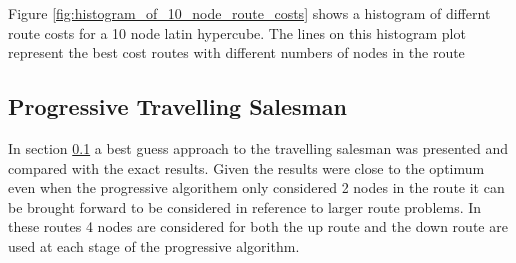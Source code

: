 \documentclass[a4paper,12pt,twoside]{article}
\begin{document}
Figure \ref{fig:histogram_of_10_node_route_costs} shows a histogram of differnt route costs for a 10 node latin hypercube. The lines on this histogram plot represent the best cost routes with different numbers of nodes in the route

\subsection{Progressive Travelling Salesman}
\label{sec:progressive_travelling_salesman}

In section \ref{sec:progressive_travelling_salesman} a best guess approach to the travelling salesman was presented and compared with the exact results. Given the results were close to the optimum even when the progressive algorithem only considered 2 nodes in the route it can be brought forward to be considered in reference to larger route problems. In these routes 4 nodes are considered for both the up route and the down route are used at each stage of the progressive algorithm.
\end{document}
